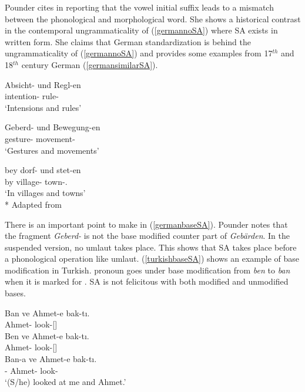 Pounder cites \citet{booij1985coordination} in reporting that the vowel initial suffix leads to a mismatch between the phonological and morphological word. She shows a historical contrast in the contemporal ungrammaticality of (\ref{germannoSA}) where SA exists in written form. She claims that German standardization is behind the ungrammaticality of (\ref{germannoSA}) and provides some examples from 17$^{th}$ and 18$^{th}$ century German (\ref{germansimilarSA}).

\begin{exe}
    \ex \label{germansimilarSA}
    \begin{xlist}
        \ex \gll Absicht- und Regl-en \\ 
        intention- {\And} rule-{\Pl} \\
        \glt `Intensions and rules'
        
        \ex \label{germanbaseSA}
        \gll Geberd- und Bewegung-en \\ 
        gesture- {\And} movement-{\Pl} \\
        \glt `Gestures and movements'
        
        \ex \gll bey dorf- und stet-en \\ 
        by village- {\And} town-{\Pl}.{\Dat} \\
        \glt `In villages and towns'\\*
        \hfill Adapted from \citet{pounder2006broken}
    \end{xlist}
\end{exe}

There is an important point to make in (\ref{germanbaseSA}). Pounder notes that the fragment \textit{Geberd-} is not the base modified counter part of \textit{Geb\"{a}rden}. In the suspended version, no umlaut takes place. This shows that SA takes place before a phonological operation like umlaut.
(\ref{turkishbaseSA}) shows an example of base modification in Turkish. {\Fsg} pronoun goes under base modification from \textit{ben} to \textit{ban} when it is marked for {\Dat}. SA is not felicitous with both modified and unmodified bases.

\begin{exe}
    \ex \label{turkishbaseSA}
    \begin{xlist}
        \ex \gll *Ban ve Ahmet-e bak-tı. \\ 
        {\Fsg} {\And} Ahmet-{\Dat} look-{\Pst}[{\Third}{\Sg}] \\
    
        \ex \gll *Ben ve Ahmet-e bak-tı. \\
        {\Fsg} {\And} Ahmet-{\Dat} look-{\Pst}[{\Third}{\Sg}] \\
        
        \ex \gll Ban-a ve Ahmet-e bak-tı. \\ 
        {\Fsg}-{\Dat} {\And} Ahmet-{\Dat} look-{\Pst}\\
        \glt `(S/he) looked at me and Ahmet.'
    \end{xlist}
\end{exe}

